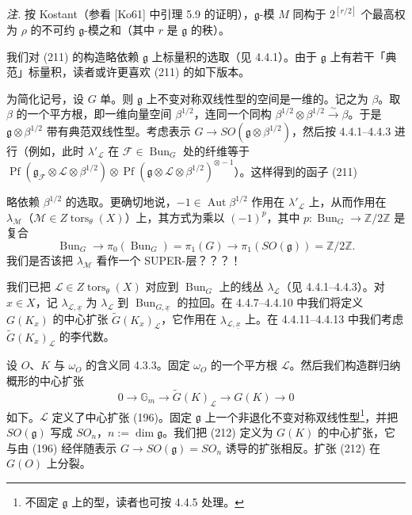 \emph{注.} 按 Kostant（参看 [Ko61] 中引理 5.9 的证明），$\mathfrak{g}$-模 $M$ 同构于 $2^{[r/2]}$ 个最高权为 $\rho$ 的不可约 $\mathfrak{g}$-模之和（其中 $r$ 是 $\mathfrak{g}$ 的秩）。

 我们对 (211) 的构造略依赖 $\mathfrak{g}$ 上标量积的选取（见 4.4.1）。由于 $\mathfrak{g}$ 上有若干「典范」标量积，读者或许更喜欢 (211) 的如下版本。

为简化记号，设 $G$ 单。则 $\mathfrak{g}$ 上不变对称双线性型的空间是一维的。记之为 $\beta$。取 $\beta$ 的一个平方根，即一维向量空间 $\beta^{1/2}$，连同一个同构 $\beta^{1/2}\otimes\beta^{1/2}\xrightarrow{\ \sim\ }\beta$。于是 $\mathfrak{g}\otimes\beta^{1/2}$ 带有典范双线性型。考虑表示 $G\to SO(\mathfrak{g}\otimes\beta^{1/2})$，然后按 4.4.1–4.4.3 进行（例如，此时 $\lambda'_{\mathcal{L}}$ 在 $\mathcal{F}\in\operatorname{Bun}_{G}$ 处的纤维等于 $\operatorname{Pf}(\mathfrak{g}_{\mathcal{F}}\otimes\mathcal{L}\otimes\beta^{1/2})\otimes\operatorname{Pf}(\mathfrak{g}\otimes\mathcal{L}\otimes\beta^{1/2})^{\otimes-1}$）。这样得到的函子 (211)


略依赖 $\beta^{1/2}$ 的选取。更确切地说，$-1\in\operatorname{Aut}\beta^{1/2}$ 作用在 $\lambda'_{\mathcal{L}}$ 上，从而作用在 $\lambda_{\mathcal{M}}$（$\mathcal{M}\in Z\operatorname{tors}_{\theta}(X)$）上，其方式为乘以 $(-1)^{p}$，其中 $p:\operatorname{Bun}_{G}\to\mathbb{Z}/2\mathbb{Z}$ 是复合
\[
\operatorname{Bun}_{G}\to\pi_{0}(\operatorname{Bun}_{G})=\pi_{1}(G)\to\pi_{1}(SO(\mathfrak{g}))=\mathbb{Z}/2\mathbb{Z}.
\]
我们是否该把 $\lambda_{\mathcal{M}}$ 看作一个 SUPER-层？？？！

 我们已把 $\mathcal{L}\in Z\operatorname{tors}_{\theta}(X)$ 对应到 $\operatorname{Bun}_{G}$ 上的线丛 $\lambda_{\mathcal{L}}$（见 4.4.1–4.4.3）。对 $x\in X$，记 $\lambda_{\mathcal{L},\underline{x}}$ 为 $\lambda_{\mathcal{L}}$ 到 $\operatorname{Bun}_{G,\underline{x}}$ 的拉回。在 4.4.7–4.4.10 中我们将定义 $G(K_{x})$ 的中心扩张 $\tilde{G}(K_{x})_{\mathcal{L}}$，它作用在 $\lambda_{\mathcal{L},\underline{x}}$ 上。在 4.4.11–4.4.13 中我们考虑 $\tilde{G}(K_{x})_{\mathcal{L}}$ 的李代数。

 设 $O$、$K$ 与 $\omega_{O}$ 的含义同 4.3.3。固定 $\omega_{O}$ 的一个平方根 $\mathcal{L}$。然后我们构造群归纳概形的中心扩张
\begin{equation}\tag{212}
0\to\mathbb{G}_{m}\to\tilde{G}(K)_{\mathcal{L}}\to G(K)\to 0
\end{equation}
如下。$\mathcal{L}$ 定义了中心扩张 (196)。固定 $\mathfrak{g}$ 上一个非退化不变对称双线性型\footnote{不固定 $\mathfrak{g}$ 上的型，读者也可按 4.4.5 处理。}，并把 $SO(\mathfrak{g})$ 写成 $SO_{n}$，$n:=\dim\mathfrak{g}$。我们把 (212) 定义为 $G(K)$ 的中心扩张，它与由 (196) 经伴随表示 $G\to SO(\mathfrak{g})=SO_{n}$ 诱导的扩张相反。扩张 (212) 在 $G(O)$ 上分裂。

